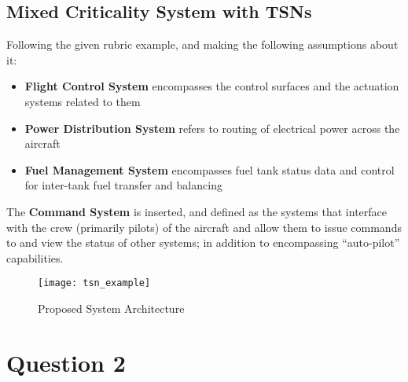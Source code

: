 
\subsection{Mixed Criticality System with TSNs}


Following the given rubric example, and making the following assumptions about it:

\begin{itemize}
    \item \textbf{Flight Control System} encompasses the control surfaces and the actuation systems related to them
    \item \textbf{Power Distribution System} refers to routing of electrical power across the aircraft
    \item \textbf{Fuel Management System} encompasses fuel tank status data and control for inter-tank fuel transfer and balancing
\end{itemize}

The \textbf{Command System} is inserted, and defined as the systems that interface with the crew (primarily pilots) of the aircraft and allow them to issue commands to and view the status of other systems; in addition to encompassing ``auto-pilot'' capabilities.

\begin{figure}[h]
\centering
\texttt{[image: tsn\_example]}
\caption{Proposed System Architecture}
\end{figure}

\section{Question 2}

